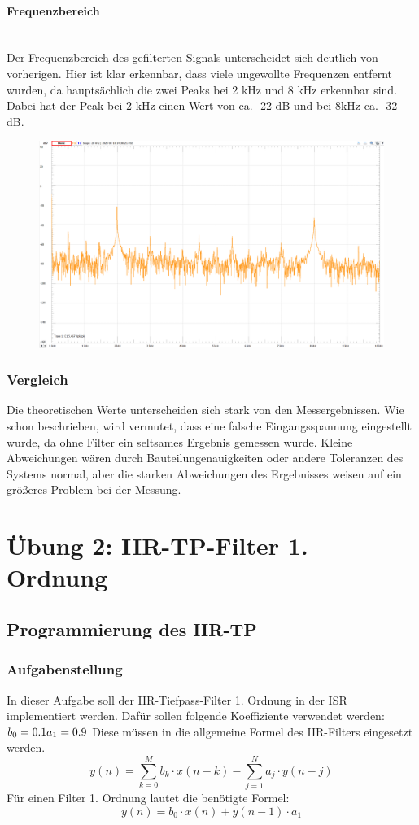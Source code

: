 \documentclass{article}
\begin{document}
\paragraph{Frequenzbereich}\mbox{}\\
Der Frequenzbereich des gefilterten Signals unterscheidet sich deutlich von vorherigen. Hier ist klar erkennbar, dass viele ungewollte Frequenzen entfernt wurden, da hauptsächlich die zwei Peaks bei 2 kHz und 8 kHz erkennbar sind. Dabei hat der Peak bei 2 kHz einen Wert von ca. -22 dB und bei 8kHz ca. -32 dB.
\begin{figure}[h]
    \centering
    \includegraphics[width=0.6\linewidth]{img/Freq_10.png}
\end{figure}

\subsubsection{Vergleich}
Die theoretischen Werte unterscheiden sich stark von den Messergebnissen. Wie schon beschrieben, wird vermutet, dass eine falsche Eingangsspannung eingestellt wurde, da ohne Filter ein seltsames Ergebnis gemessen wurde. Kleine Abweichungen wären durch Bauteilungenauigkeiten oder andere Toleranzen des Systems normal, aber die starken Abweichungen des Ergebnisses weisen auf ein größeres Problem bei der Messung.

\newpage
\section{Übung 2: IIR-TP-Filter 1. Ordnung}
\subsection{Programmierung des IIR-TP}
\subsubsection{Aufgabenstellung}
In dieser Aufgabe soll der IIR-Tiefpass-Filter 1. Ordnung in der ISR implementiert werden. Dafür sollen folgende Koeffiziente verwendet werden:
\begin{math}
    b_0=0.1\\
    a_1=0.9
\end{math}
Diese müssen in die allgemeine Formel des IIR-Filters eingesetzt werden.
\begin{equation}
    y(n) = \sum_{k=0}^{M} b_k \cdot x(n-k) - \sum_{j=1}^{N} a_j \cdot y(n-j)
    \label{eq:iir_filter}
\end{equation}
Für einen Filter 1. Ordnung lautet die benötigte Formel:
\begin{equation}
    y(n) = b_0 \cdot x(n) + y(n-1) \cdot a_1
\end{equation}
\end{document}
